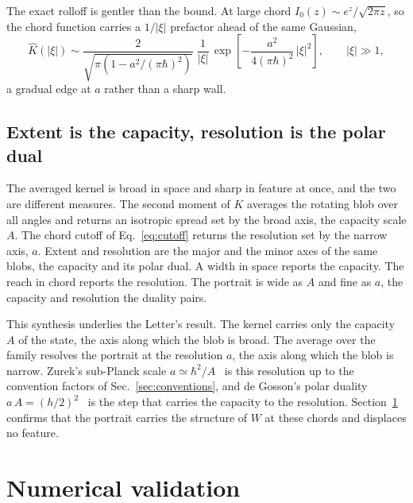 \documentclass[%
  aps, amsmath, amssymb, onecolumn, 11pt
]{revtex4-2}
\begin{document}
The exact rolloff is gentler than the bound. At large chord
$I_0(z)\sim e^{z}/\sqrt{2\pi z}$, so the chord function carries a $1/|\xi|$
prefactor ahead of the same Gaussian,
\begin{equation}
\widehat{K}(|\xi|)
\sim \frac{2}{\sqrt{\pi\left(1 - a^2/(\pi\hbar)^2\right)}}\;
\frac{1}{|\xi|}\,
\exp\!\left[-\frac{a^2}{4(\pi\hbar)^2}\,|\xi|^2\right],
\qquad |\xi| \gg 1,
\label{eq:Kbar_asymp}
\end{equation}
a gradual edge at $a$ rather than a sharp wall.

\subsection{Extent is the capacity, resolution is the polar dual}
\label{sec:extent}

The averaged kernel is broad in space and sharp in feature at once, and
the two are different measures. The second moment of $K$ averages the
rotating blob over all angles and returns an isotropic spread set by the
broad axis, the capacity scale $A$. The chord cutoff of
Eq.~\eqref{eq:cutoff} returns the resolution set by the narrow axis, $a$. Extent and resolution are the major and the minor axes
of the same blobs, the capacity and its polar dual. A width in space
reports the capacity. The reach in chord reports the resolution. The
portrait is wide as $A$ and fine as $a$, the capacity and resolution the duality pairs.

This synthesis underlies the Letter's result. The kernel carries only the
capacity $A$ of the state, the axis along which the blob is broad. The
average over the family resolves the portrait at the resolution $a$, the axis along which the blob is narrow. Zurek's sub-Planck
scale $a \simeq \hbar^2/A$~\cite{zurek2001} is this resolution up to the
convention factors of Sec.~\ref{sec:conventions}, and de Gosson's polar
duality $a\,A = (h/2)^2$~\cite{degosson2022polar} is the step that carries the capacity to the resolution. Section~\ref{sec:numerics} confirms
that the portrait carries the structure of $W$ at these chords and
displaces no feature.


\section{Numerical validation}
\label{sec:numerics}
\end{document}
